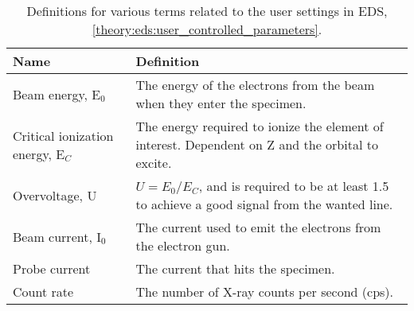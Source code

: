\begin{table}[pht]
    \begin{center}
        \caption{
            Definitions for various terms related to the user settings in EDS, \cref{theory:eds:user_controlled_parameters}.
        }
        \renewcommand*{\arraystretch}{1.4}
        \label{tab:eds:userparameters}
        \begin{tabular}{p{2.6cm}p{12cm}}
            \hline
            \textbf{Name}                     & \textbf{Definition}                                                                                                                                                                                                        \\
            \hline
            Beam energy, E$_0$                & The energy of the electrons from the beam when they enter the specimen.                                                                                                                                                    \\
            Critical ionization energy, E$_C$ & The energy required to ionize the element of interest. Dependent on Z and the orbital to excite.                                                                                                                           \\
            Overvoltage, U                    & $ U = E_0 / E_C $, and is required to be at least 1.5 to achieve a good signal from the wanted line.                                                                                                                       \\
            Beam current, I$_0$               & The current used to emit the electrons from the electron gun.                                                                                                                                                              \\
            Probe current                     & The current that hits the specimen.                                                                                                                                                                                        \\
            Count rate                        & The number of X-ray counts per second (cps).                                                                                                                                                                               \\

\end{tabular}
\end{center}
\end{table}
